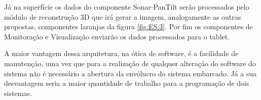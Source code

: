 Já na superfície os dados do componente Sonar-PanTilt serão processados pelo
módulo de reconstrução 3D que irá gerar a imagem, analogamente as outras
propostas, componentes laranjas da figura \ref{fig:ES:3}.
Por fim os componentes de Monitoração e Visualiza\-ção enviarão os dados
processados para o tablet.

A maior vantagem dessa arquitetura, na ótica de software, é a facilidade de
manutenção, uma vez que para a realização de qualquer alteração do software do
sistema não é necessário a abertura da envólucro do sistema embarcado. Já a sua
desvantagem seria a maior quantidade de trabalho para a programação de dois
sistemas.